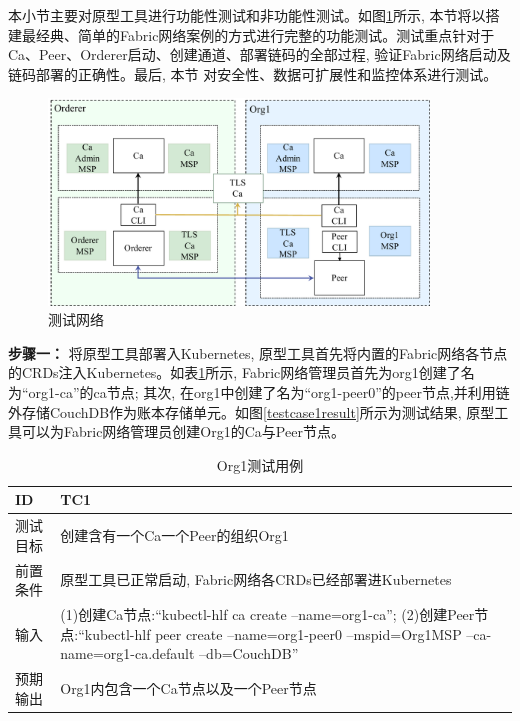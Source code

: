 本小节主要对原型工具进行功能性测试和非功能性测试。如图\ref{fabric_net}所示, 本节将以搭建最经典、简单的Fabric网络案例的方式进行完整的功能测试。测试重点针对于Ca、Peer、Orderer启动、创建通道、部署链码的全部过程, 验证Fabric网络启动及链码部署的正确性。最后, 本节 对安全性、数据可扩展性和监控体系进行测试。

\begin{figure}[h] %
    \centering %
    \includegraphics[width=0.9\textwidth]{FIGs/chapter5/fabric_net.pdf} %
    \caption{测试网络} %
    \label{fabric_net} %
\end{figure}%


\textbf{步骤一：} 将原型工具部署入Kubernetes, 原型工具首先将内置的Fabric网络各节点的CRDs注入Kubernetes。如表\ref{org1_test}所示, Fabric网络管理员首先为org1创建了名为“org1-ca”的ca节点; 其次, 在org1中创建了名为“org1-peer0”的peer节点,并利用链外存储CouchDB作为账本存储单元。如图\ref{testcase1result}所示为测试结果, 原型工具可以为Fabric网络管理员创建Org1的Ca与Peer节点。

{\footnotesize
\begin{longtable}[h]{m{60pt}|m{280pt}}
    \caption[创建Org1测试用例]{Org1测试用例} \label{org1_test}\\
        \hline  
        ID&TC1\\
        \hline
        测试目标&创建含有一个Ca一个Peer的组织Org1\\
        \hline
        前置条件&原型工具已正常启动, Fabric网络各CRDs已经部署进Kubernetes\\
        \hline
        输入& (1)创建Ca节点:“kubectl-hlf ca create --name=org1-ca”;
        \newline (2)创建Peer节点:“kubectl-hlf peer create --name=org1-peer0 --mspid=Org1MSP --ca-name=org1-ca.default --db=CouchDB” \\

        \hline 
        预期输出& Org1内包含一个Ca节点以及一个Peer节点\\
        \hline
    \end{longtable} 
}


